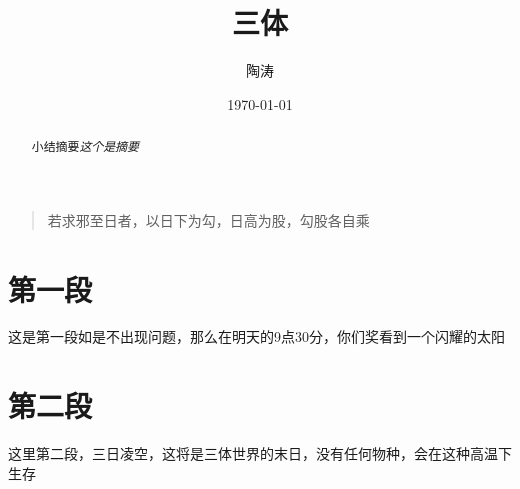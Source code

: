 \documentclass[UTF8]{ctexart}
\title{三体}
\author{陶涛}
\date{\today}
\begin{document}
\maketitle

\tableofcontents

\begin{abstract}
小结摘要\emph{这个是摘要}
\end{abstract}

\begin{quote}
\kaishu 若求邪至日者，以日下为勾，日高为股，勾股各自乘
\end{quote}

\section{第一段}
这是第一段如是不出现问题，那么在明天的9点30分，你们奖看到一个闪耀的太阳
\section{第二段}
这里第二段，三日凌空，这将是三体世界的末日，没有任何物种，会在这种高温下生存

\end{document}
